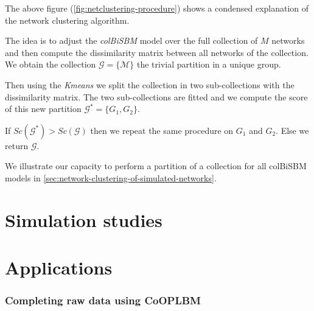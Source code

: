 \documentclass[12pt,a4paper]{report}
\begin{document}
The above figure (\ref{fig:netclustering-procedure}) shows a condensed
explanation of the network clustering algorithm.

The idea is to adjust the \emph{colBiSBM} model over the full collection of $M$
networks and then compute the dissimilarity matrix between all networks of the
collection. We obtain the collection $\mathcal{G} = \{\mathcal{M}\}$ the trivial
partition in a unique group.

Then using the \emph{Kmeans} we split the collection in two sub-collections with
the dissimilarity matrix. The two sub-collections are fitted and we compute
the score of this new partition $\mathcal{G}^{*} = \{G_1, G_2\}$.

If $Sc(\mathcal{G}^{*}) > Sc(\mathcal{G})$ then we repeat the same procedure on
$G_1$ and $G_2$. Else we return $\mathcal{G}$.

We illustrate our capacity to perform a partition of a collection for all
colBiSBM models in \ref{sec:network-clustering-of-simulated-networks}.

\chapter{Simulation studies}\label{chap:simulation-studies}




\chapter{Applications}

% 
\subsection{Completing raw data using CoOPLBM \parencite{anakokDisentanglingStructureEcological2022}}



\printbibliography
\listoffigures
\listoftables
\end{document}

